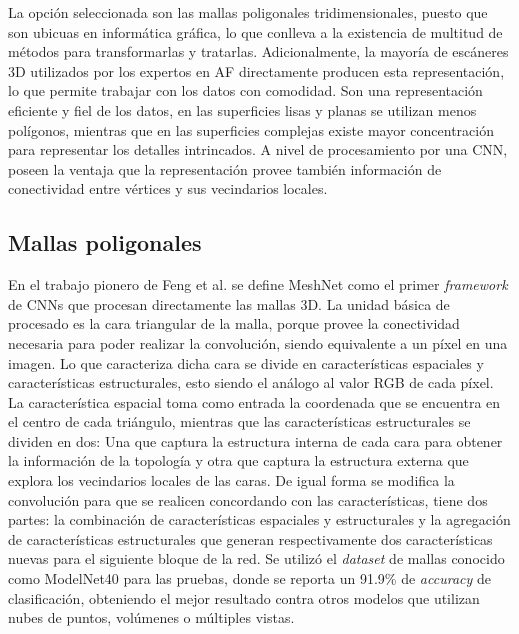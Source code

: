 La opción seleccionada son las mallas poligonales tridimensionales, puesto que son ubicuas en informática gráfica, lo que conlleva a la existencia de multitud de métodos para transformarlas y tratarlas.  Adicionalmente, la mayoría de escáneres 3D utilizados por los expertos en AF directamente producen esta representación, lo que permite trabajar con los datos con comodidad. Son una representación eficiente y fiel de los datos, en las superficies lisas y planas se utilizan menos polígonos, mientras que en las superficies complejas existe mayor concentración para representar los detalles intrincados. A nivel de procesamiento por una CNN, poseen la ventaja que la representación provee también información de conectividad entre vértices y sus vecindarios locales.

\subsection{Mallas poligonales}

En el trabajo pionero de Feng et al. \cite{feng2019meshnet} se define MeshNet como el primer \textit{framework} de CNNs que procesan directamente las mallas 3D. La unidad básica de procesado es la cara triangular de la malla, porque provee la conectividad necesaria para poder realizar la convolución, siendo equivalente a un píxel en una imagen. Lo que caracteriza dicha cara se divide en características espaciales y características estructurales, esto siendo el análogo al valor RGB de cada píxel. La característica espacial toma como entrada la coordenada que se encuentra en el centro de cada triángulo, mientras que las características estructurales se dividen en dos: Una que captura la estructura interna de cada cara para obtener la información de la topología y otra que captura la estructura externa que explora los vecindarios locales de las caras.  De igual forma se modifica la convolución para que se realicen concordando con las características, tiene dos partes: la combinación de características espaciales y estructurales y la agregación de características estructurales que generan respectivamente dos características nuevas para el siguiente bloque de la red. Se utilizó el \textit{dataset} de mallas conocido como ModelNet40 \cite{wu20153d} para las pruebas, donde se reporta un 91.9\% de \textit{accuracy} de clasificación, obteniendo el mejor resultado contra otros modelos que utilizan nubes de puntos, volúmenes o múltiples vistas.


